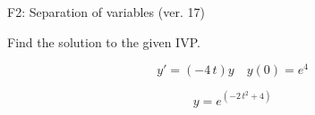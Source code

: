 \begin{exercise}
  \begin{exerciseTitle}F2: Separation of variables (ver. 17)\end{exerciseTitle}
  \begin{exerciseStatement}
    
Find the solution to the given IVP.

    
\[y'=( -4 \, t )y\hspace{1em} y(0)= e^{4}\]

  \end{exerciseStatement}
  \begin{exerciseAnswer}
    
\[y= e^{\left(-2 \, t^{2} + 4\right)}\]

  \end{exerciseAnswer}
\end{exercise}